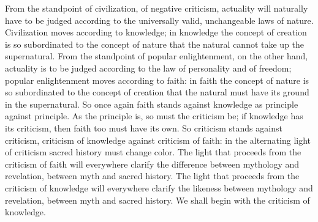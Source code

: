 \documentclass[12pt]{book}
\begin{document}
From the standpoint of civilization, of negative criticism, actuality
will naturally have to be judged according to the universally valid,
unchangeable laws of nature. Civilization moves according to
knowledge; in knowledge the concept of creation is so subordinated to
the concept of nature that the natural cannot take up the supernatural.
From the standpoint of popular enlightenment, on the other hand,
actuality is to be judged according to the law of personality and of
freedom; popular enlightenment moves according to faith: in faith the
concept of nature is so subordinated to the concept of creation that the
natural must have its ground in the supernatural. So once again faith
stands against knowledge as principle against principle. As the
principle is, so must the criticism be; if knowledge has its criticism,
then faith too must have its own. So criticism stands against
criticism, criticism of knowledge against criticism of faith: in the
alternating light of criticism sacred history must change color. The
light that proceeds from the criticism of faith will everywhere clarify
the difference between mythology and revelation, between myth and
sacred history. The light that proceeds from the criticism of knowledge
will everywhere clarify the likeness between mythology and revelation,
between myth and sacred history. We shall begin with the criticism of
knowledge.
\end{document}
